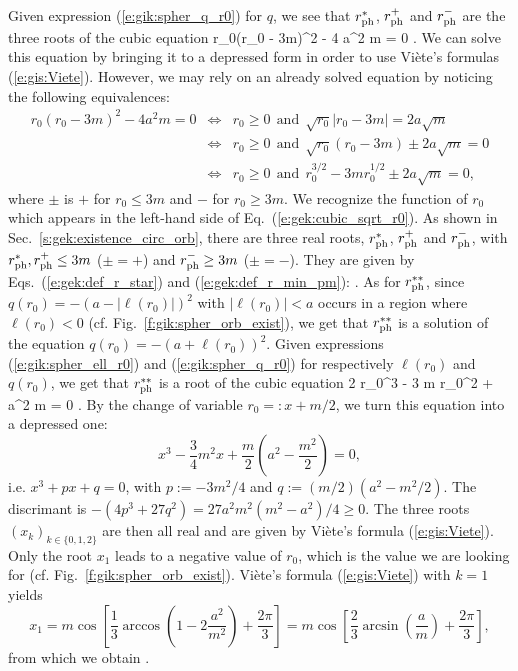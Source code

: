 Given expression (\ref{e:gik:spher_q_r0}) for $q$, we see that
$r_{\rm ph}^*$, $r_{\rm ph}^+$ and $r_{\rm ph}^-$
are the three roots of the cubic equation
\be
r_0(r_0 - 3m)^2 - 4 a^2 m  = 0 .
\ee
We can solve this equation by bringing it to a depressed form in order
to use Viète's formulas (\ref{e:gis:Viete}). However, we may rely on an
already solved equation by noticing the following equivalences:
\begin{eqnarray}
r_0(r_0 - 3m)^2 - 4 a^2 m  = 0  & \iff & r_0 \geq 0 \ \ \mbox{and} \ \
            \sqrt{r_0} | r_0 - 3 m | = 2 a\sqrt{m} \nonumber \\
& \iff &  r_0 \geq 0 \ \ \mbox{and} \ \
    \sqrt{r_0} (r_0 - 3 m ) \pm 2 a \sqrt{m} = 0 \nonumber \\
& \iff &  r_0 \geq 0 \ \ \mbox{and} \ \
    r_0^{3/2} - 3 m r_0^{1/2} \pm 2 a \sqrt{m} = 0 , \nonumber
\end{eqnarray}
where $\pm$ is $+$ for $r_0 \leq 3 m$ and $-$ for $r_0 \geq 3m$.
We recognize the function of $r_0$ which appears in the left-hand side
of Eq.~(\ref{e:gek:cubic_sqrt_r0}). As shown in Sec.~\ref{s:gek:existence_circ_orb},
there are three real roots,
$r_{\rm ph}^*$, $r_{\rm ph}^+$ and $r_{\rm ph}^-$, with
$r_{\rm ph}^*, r_{\rm ph}^+\leq 3m$ ($\pm = +$)
and $r_{\rm ph}^- \geq 3m$ ($\pm = -$). They are given by Eqs.~(\ref{e:gek:def_r_star})
and (\ref{e:gek:def_r_min_pm}):
\be \label{e:gik:rph_s}
    .
\ee
\be \label{e:gik:rph_pm}
   \encadre{ r_{\rm ph}^\pm := 4m\cos^2 \left[ \frac{1}{3} \arccos\left( \mp \frac{a}{m} \right) \right] }
\ee
As for $r_{\rm ph}^{**}$, since $q(r_0) = - (a - |\ell(r_0)|)^2$ with
$|\ell(r_0)|  < a$ occurs in a region where $\ell(r_0) < 0$ (cf. Fig.~\ref{f:gik:spher_orb_exist}),
we get that $r_{\rm ph}^{**}$ is a solution of the equation
$q(r_0) = - (a + \ell(r_0))^2$. Given expressions (\ref{e:gik:spher_ell_r0}) and (\ref{e:gik:spher_q_r0})
for respectively $\ell(r_0)$ and $q(r_0)$, we get that $r_{\rm ph}^{**}$ is a root of the cubic
equation
\be \label{e:gik:cubic_rph_ss}
    2 r_0^3 - 3 m r_0^2 + a^2 m = 0 .
\ee
By the change of variable $r_0 =: x + m/2$, we turn this equation into a depressed one:
\[
    x^3  - \frac{3}{4} m^2 x + \frac{m}{2} \left(a^2 - \frac{m^2}{2} \right) = 0 ,
\]
i.e. $x^3 + px + q = 0$, with $p:= -3m^2/4$ and $q:=(m/2)(a^2 - m^2/2)$.
The discrimant is $-(4 p^3 + 27 q^2) = 27 a^2 m^2 (m^2 - a^2)/4 \geq 0$. The three roots
$(x_k)_{k\in\{0,1,2\}}$ are then all real and are given by Viète's formula (\ref{e:gis:Viete}).
Only the root $x_1$ leads to a negative value of $r_0$, which is the value we
are looking for (cf. Fig.~\ref{f:gik:spher_orb_exist}). Viète's formula (\ref{e:gis:Viete})
with $k=1$ yields
\[
    x_1 = m \cos\left[ \frac{1}{3} \arccos\left(1 - 2 \frac{a^2}{m^2} \right) + \frac{2\pi}{3} \right]
        = m \cos\left[ \frac{2}{3} \arcsin\left(\frac{a}{m}\right) + \frac{2\pi}{3} \right] ,
\]
from which we obtain
\be \label{e:gik:rph_ss}
    .
\ee


